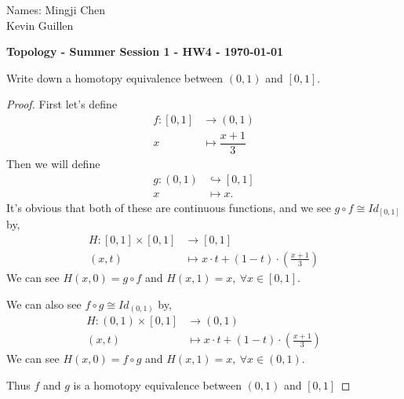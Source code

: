\documentclass[12pt]{article}
\DeclarePairedDelimiter\set\{\}
\begin{document}
\begin{flushright}
    Names: Mingji Chen \\ Kevin Guillen
    
\end{flushright}
\begin{center}
    {\bf Topology - Summer Session 1 - HW4 - \today}
\end{center}
Write down a homotopy equivalence between $(0,1)$ and $[0,1]$.
\begin{proof}
    First let's define 
    \begin{align*}
        f: [0,1] &\to (0,1) \\ x&\mapsto \dfrac{x+1}{3}
    \end{align*} Then we will define
    \begin{align*}
        g:(0,1)&\hookrightarrow [0,1] \\ x &\mapsto x.
    \end{align*}
    It's obvious that both of these are continuous functions, and we see $g\circ f \cong  Id_{[0,1]}$ by,
    \begin{align*}
        H: [0,1]\times [0,1] &\to [0,1]\\
        (x,t)&\mapsto x\cdot t + (1-t)\cdot\left(\frac{x+1}{3}\right)
    \end{align*}
    We can see $H(x,0) = g\circ f$ and $H(x,1) = x,\ \forall x \in [0,1]$.

    We can also see $f\circ g \cong Id_{(0,1)}$ by,
    \begin{align*}
        H:(0,1)\times [0,1] &\to (0,1) \\
        (x,t) &\mapsto x\cdot t + (1-t)\cdot\left(\frac{x+1}{3}\right)
    \end{align*}
    We can see $H(x,0) = f\circ g$ and $H(x,1) = x,\ \forall x \in (0,1)$.

    Thus $f$ and $g$ is a homotopy equivalence between $(0,1)$ and $[0,1]$
\end{proof}

\end{document}
